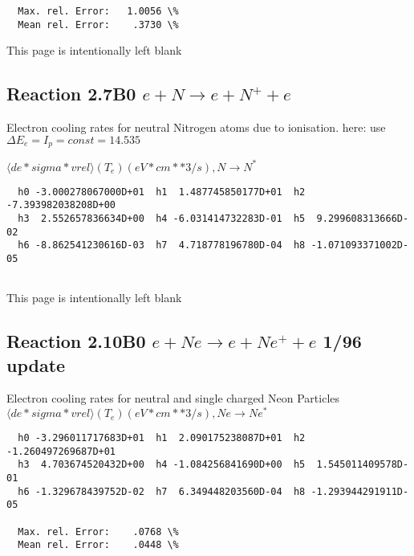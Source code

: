 \documentclass[12pt,dvipdfmx]{article}
\begin{document}
{\begin{small}
\begin{verbatim}
  Max. rel. Error:   1.0056 \%
  Mean rel. Error:    .3730 \%

\end{verbatim}\end{small}

\newpage
This page is intentionally left blank
\newpage

\subsection{
Reaction 2.7B0 $e + N \rightarrow e + N^{+} + e  $
}

 Electron cooling rates for neutral Nitrogen atoms due to ionisation.
 here: use $\Delta E_e = I_p = const = 14.535$



 $ \langle de*sigma*vrel \rangle(T_e)  (eV*cm**3/s), N \rightarrow N^{*} $


\begin{small}\begin{verbatim}
  h0 -3.000278067000D+01  h1  1.487745850177D+01  h2 -7.393982038208D+00
  h3  2.552657836634D+00  h4 -6.031414732283D-01  h5  9.299608313666D-02
  h6 -8.862541230616D-03  h7  4.718778196780D-04  h8 -1.071093371002D-05


\end{verbatim}\end{small}

\newpage
This page is intentionally left blank
\newpage


\subsection{
Reaction 2.10B0 $e + Ne \rightarrow e + Ne^+ + e  $ 1/96 update
}

  Electron cooling rates for neutral and single
  charged Neon Particles
 $ \langle de*sigma*vrel \rangle(T_e)  (eV*cm**3/s), Ne  \rightarrow  Ne^*$

\begin{small}\begin{verbatim}
  h0 -3.296011717683D+01  h1  2.090175238087D+01  h2 -1.260497269687D+01
  h3  4.703674520432D+00  h4 -1.084256841690D+00  h5  1.545011409578D-01
  h6 -1.329678439752D-02  h7  6.349448203560D-04  h8 -1.293944291911D-05

  Max. rel. Error:    .0768 \%
  Mean rel. Error:    .0448 \%


\end{verbatim}\end{small}


}
\end{document}
